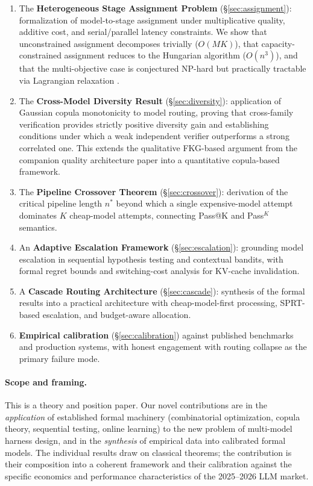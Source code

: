 \documentclass[11pt, a4paper, copyright]{googledeepmind}
\begin{document}
\begin{enumerate}
\item The \textbf{Heterogeneous Stage Assignment Problem} (\S\ref{sec:assignment}): formalization of model-to-stage assignment under multiplicative quality, additive cost, and serial/parallel latency constraints. We show that unconstrained assignment decomposes trivially ($O(MK)$), that capacity-constrained assignment reduces to the Hungarian algorithm ($O(n^3)$), and that the multi-objective case is conjectured NP-hard but practically tractable via Lagrangian relaxation \citep{dekoninck2025cascade}.

\item The \textbf{Cross-Model Diversity Result} (\S\ref{sec:diversity}): application of Gaussian copula monotonicity \citep{sklar1959, nelsen2006copulas} to model routing, proving that cross-family verification provides strictly positive diversity gain and establishing conditions under which a weak independent verifier outperforms a strong correlated one. This extends the qualitative FKG-based argument from the companion quality architecture paper into a quantitative copula-based framework.

\item The \textbf{Pipeline Crossover Theorem} (\S\ref{sec:crossover}): derivation of the critical pipeline length $n^*$ beyond which a single expensive-model attempt dominates $K$ cheap-model attempts, connecting Pass@K and Pass${}^K$ semantics.

\item An \textbf{Adaptive Escalation Framework} (\S\ref{sec:escalation}): grounding model escalation in sequential hypothesis testing and contextual bandits, with formal regret bounds and switching-cost analysis for KV-cache invalidation.

\item A \textbf{Cascade Routing Architecture} (\S\ref{sec:cascade}): synthesis of the formal results into a practical architecture with cheap-model-first processing, SPRT-based escalation, and budget-aware allocation.

\item \textbf{Empirical calibration} (\S\ref{sec:calibration}) against published benchmarks and production systems, with honest engagement with routing collapse as the primary failure mode.
\end{enumerate}

\paragraph{Scope and framing.} This is a theory and position paper. Our novel contributions are in the \emph{application} of established formal machinery (combinatorial optimization, copula theory, sequential testing, online learning) to the new problem of multi-model harness design, and in the \emph{synthesis} of empirical data into calibrated formal models. The individual results draw on classical theorems; the contribution is their composition into a coherent framework and their calibration against the specific economics and performance characteristics of the 2025--2026 LLM market.
\end{document}
